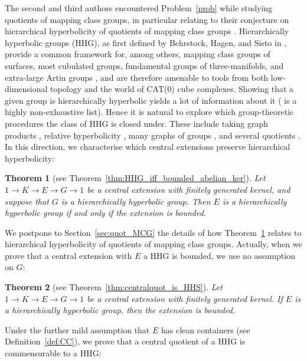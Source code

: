 \documentclass[svgnames]{amsart}
\theoremstyle{plain}
\newtheorem{thm}{Theorem}[section]
\theoremstyle{definition}
\begin{document}
The second and third authors encountered Problem~\ref{prob} while studying quotients of mapping class groups, in particular relating to their conjecture on hierarchical hyperbolicity of quotients of mapping class groups \cite[Question 3]{MS_rigidity_MCG}. Hierarchically hyperbolic groups (HHG), as first defined by Behrstock, Hagen, and Sisto in \cite{HHS_I}, provide a common framework for, among others, mapping class groups of surfaces, most cubulated groups, fundamental groups of three-manifolds, and extra-large Artin groups \cite{hagensusse, HRSS_3manifold,ELTAG}, and are therefore amenable to tools from both low-dimensional topology and the world of CAT(0) cube complexes. Showing that a given group is hierarchically hyperbolic yields a lot of information about it (\cite{quasiflat,HHP:coarse,ANS:UEG,HHL:proximal,DMS:stable,FarrellJones} is a highly non-exhaustive list). Hence it is natural to explore which group-theoretic procedures the class of HHG is closed under. These include taking graph products \cite{graphprod}, relative hyperbolicity \cite{HHS_II}, many graphs of groups \cite{berlairobbio}, and several quotients \cite{BHMS, short_HHG:II,random_quot}. In this direction, we characterise which central extensions preserve hierarchical hyperbolicity:

\begin{thm}[see Theorem~\ref{thm:HHG_iff_bounded_abelian_ker}]
\label{thmintro:HHG_iff_bounded}
Let $1\to K\to E\to G\to 1$ be a central extension with finitely generated kernel, and suppose that $G$ is a hierarchically hyperbolic group. Then $E$ is a hierarchically hyperbolic group if and only if the extension is bounded.
\end{thm}
We postpone to Section~\ref{sec:quot_MCG} the details of how Theorem~\ref{thmintro:HHG_iff_bounded} relates to hierarchical hyperbolicity of quotients of mapping class groups. Actually, when we prove that a central extension with $E$ a HHG is bounded, we use no assumption on $G$:
\begin{thm}[see Theorem~\ref{thm:centralquot_is_HHS}]\label{thm:centralext_is_bdd:intro}
    Let $1\to K\to E\to G\to 1$ be a central extension with finitely generated kernel. If $E$ is a hierarchically hyperbolic group, then the extension is bounded. 
\end{thm}


Under the further mild assumption that $E$ has clean containers (see Definition~\ref{def:CC}), we prove that a central quotient of a HHG is commensurable to a HHG:
\end{document}

